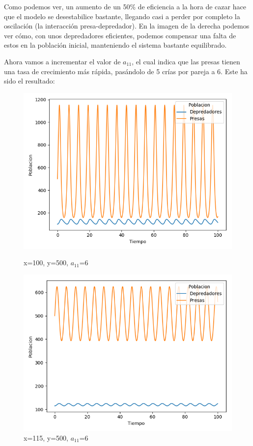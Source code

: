 \documentclass[11pt,a4paper]{article}
\begin{document}
Como podemos ver, un aumento de un 50\% de eficiencia a la hora de cazar hace que el modelo se desestabilice bastante, llegando casi a perder
por completo la oscilación (la interacción presa-depredador). En la imagen de la derecha podemos ver cómo, con unos depredadores eficientes,
podemos compensar una falta de estos en la población inicial, manteniendo el sistema bastante equilibrado.

Ahora vamos a incrementar el valor de $a_{11}$, el cual indica que las presas tienen una tasa de crecimiento más rápida, pasándolo de 5 crías
por pareja a 6. Este ha sido el resultado:
\begin{figure}[H]
	\centering
	\begin{minipage}{0.5\textwidth}
		\centering
		\includegraphics[scale=0.4]{img/4-a11-100-500.png}
		\caption{x=100, y=500, $a_{11}$=6}
	\end{minipage}%
	\begin{minipage}{0.5\textwidth}
		\centering
		\includegraphics[scale=0.4]{img/4-a11-115-500.png}
		\caption{x=115, y=500, $a_{11}$=6}
	\end{minipage}
\end{figure}
\end{document}
